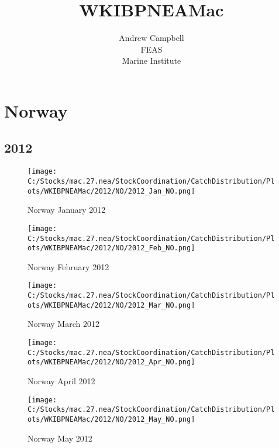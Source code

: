 \documentclass{article}
\begin{document}
\title{WKIBPNEAMac}
\author{Andrew Campbell \\ FEAS \\ Marine Institute}
\maketitle

\tableofcontents

\section{Norway}



\newpage

\subsection{2012}



\begin{figure}[h]
	\centering
		\texttt{[image: C:/Stocks/mac.27.nea/StockCoordination/CatchDistribution/Plots/WKIBPNEAMac/2012/NO/2012\_Jan\_NO.png]}
	\caption{Norway January 2012}
	\label{fig:2012_Jan_NO}
\end{figure}

\begin{figure}
	\centering
		\texttt{[image: C:/Stocks/mac.27.nea/StockCoordination/CatchDistribution/Plots/WKIBPNEAMac/2012/NO/2012\_Feb\_NO.png]}
	\caption{Norway February 2012}
	\label{fig:2012_Feb_NO}
\end{figure}

\begin{figure}
	\centering
		\texttt{[image: C:/Stocks/mac.27.nea/StockCoordination/CatchDistribution/Plots/WKIBPNEAMac/2012/NO/2012\_Mar\_NO.png]}
	\caption{Norway March 2012}
	\label{fig:2012_Mar_NO}
\end{figure}

\begin{figure}
	\centering
		\texttt{[image: C:/Stocks/mac.27.nea/StockCoordination/CatchDistribution/Plots/WKIBPNEAMac/2012/NO/2012\_Apr\_NO.png]}
	\caption{Norway April 2012}
	\label{fig:2012_Apr_NO}
\end{figure}

\begin{figure}
	\centering
		\texttt{[image: C:/Stocks/mac.27.nea/StockCoordination/CatchDistribution/Plots/WKIBPNEAMac/2012/NO/2012\_May\_NO.png]}
	\caption{Norway May 2012}
	\label{fig:2012_May_NO}
\end{figure}
\end{document}
